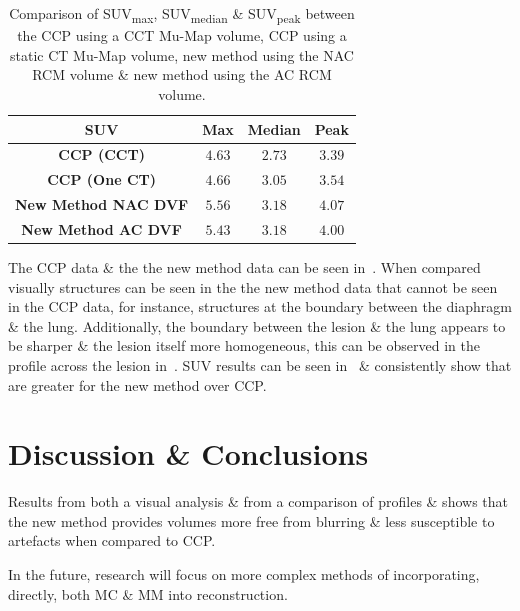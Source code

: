     \begin{table}
        \centering
        \captionsetup{singlelinecheck=false, justification=centering}
        \caption{Comparison of \gls{SUV}\textsubscript{max}, \gls{SUV}\textsubscript{median} \& \gls{SUV}\textsubscript{peak} between the \gls{CCP} using a \gls{CCT} \gls{Mu-Map} volume, \gls{CCP} using a static \gls{CT} \gls{Mu-Map} volume, new method using the \gls{NAC} \gls{RCM} volume \& new method using the \gls{AC} \gls{RCM} volume.}
        
        \resizebox*{0.75\linewidth}{!}
        {
            \begin{tabular}{||c|ccc||}
                \hline
                \textbf{\gls{SUV}} & \textbf{Max} & \textbf{Median} & \textbf{Peak} \\
                \hline
                \textbf{\gls{CCP} (\gls{CCT})}          & $4.63$ & $2.73$ & $3.39$ \\
                \textbf{\gls{CCP} (One \gls{CT})}       & $4.66$ & $3.05$ & $3.54$ \\
                \hline
                \textbf{New Method \gls{NAC} \gls{DVF}} & $5.56$ & $3.18$ & $4.07$ \\
                \textbf{New Method \gls{AC} \gls{DVF}}  & $5.43$ & $3.18$ & $4.00$ \\
                \hline
            \end{tabular}
        }
        \label{tab:suv}
    \end{table}
    
     The \gls{CCP} data \& the the new method data can be seen in~. When compared visually structures can be seen in the the new method data that cannot be seen in the \gls{CCP} data, for instance, structures at the boundary between the diaphragm \& the lung. Additionally, the boundary between the lesion \& the lung appears to be sharper \& the lesion itself more homogeneous, this can be observed in the profile across the lesion in~. \gls{SUV} results can be seen in~ \& consistently show that  are greater for the new method over \gls{CCP}.

\section{Discussion \& Conclusions} \label{sec:discussion_and_conclusions}
    Results from both a visual analysis \& from a comparison of profiles \&  shows that the new method provides volumes more free from blurring \& less susceptible to artefacts when compared to \gls{CCP}.
    
    In the future, research will focus on more complex methods of incorporating, directly, both \gls{MC}  \& \gls{MM} into reconstruction.